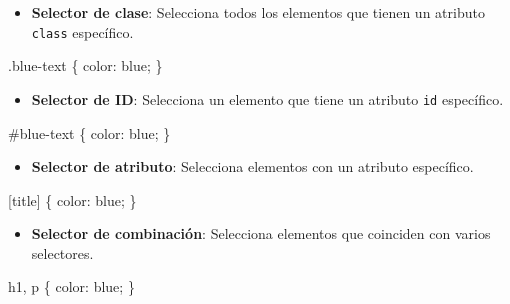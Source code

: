 \documentclass[
  a4paper,
  DIV=11,
  numbers=noendperiod,
  onepage,
  openany]{scrreprt}
\newenvironment{Shaded}{\begin{snugshade}}{\end{snugshade}}
\newcommand{\ConstantTok}[1]{\textcolor[rgb]{0.56,0.35,0.01}{#1}}
\newcommand{\ExtensionTok}[1]{\textcolor[rgb]{0.00,0.23,0.31}{#1}}
\newcommand{\FunctionTok}[1]{\textcolor[rgb]{0.28,0.35,0.67}{#1}}
\newcommand{\KeywordTok}[1]{\textcolor[rgb]{0.00,0.23,0.31}{#1}}
\newcommand{\NormalTok}[1]{\textcolor[rgb]{0.00,0.23,0.31}{#1}}
\newcommand{\OperatorTok}[1]{\textcolor[rgb]{0.37,0.37,0.37}{#1}}
\newcommand{\PreprocessorTok}[1]{\textcolor[rgb]{0.68,0.00,0.00}{#1}}
\providecommand{\tightlist}{%
  \setlength{\itemsep}{0pt}\setlength{\parskip}{0pt}}\usepackage{longtable,booktabs,array}
\begin{document}
\begin{itemize}
\tightlist
\item
  \textbf{Selector de clase}: Selecciona todos los elementos que tienen
  un atributo \texttt{class} específico.
\end{itemize}

\begin{Shaded}
\begin{Highlighting}[]
\FunctionTok{.blue{-}text}\NormalTok{ \{}
  \KeywordTok{color}\NormalTok{: }\ConstantTok{blue}\OperatorTok{;}
\NormalTok{\}}
\end{Highlighting}
\end{Shaded}

\begin{itemize}
\tightlist
\item
  \textbf{Selector de ID}: Selecciona un elemento que tiene un atributo
  \texttt{id} específico.
\end{itemize}

\begin{Shaded}
\begin{Highlighting}[]
\PreprocessorTok{\#blue{-}text}\NormalTok{ \{}
  \KeywordTok{color}\NormalTok{: }\ConstantTok{blue}\OperatorTok{;}
\NormalTok{\}}
\end{Highlighting}
\end{Shaded}

\begin{itemize}
\tightlist
\item
  \textbf{Selector de atributo}: Selecciona elementos con un atributo
  específico.
\end{itemize}

\begin{Shaded}
\begin{Highlighting}[]
\ExtensionTok{[title]}\NormalTok{ \{}
  \KeywordTok{color}\NormalTok{: }\ConstantTok{blue}\OperatorTok{;}
\NormalTok{\}}
\end{Highlighting}
\end{Shaded}

\begin{itemize}
\tightlist
\item
  \textbf{Selector de combinación}: Selecciona elementos que coinciden
  con varios selectores.
\end{itemize}

\begin{Shaded}
\begin{Highlighting}[]
\NormalTok{h1}\OperatorTok{,}\NormalTok{ p \{}
  \KeywordTok{color}\NormalTok{: }\ConstantTok{blue}\OperatorTok{;}
\NormalTok{\}}
\end{Highlighting}
\end{Shaded}
\end{document}
